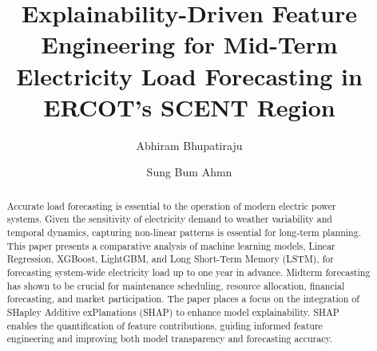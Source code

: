 \documentclass{ifacconf}
\begin{document}
\begin{frontmatter}

\title{Explainability-Driven Feature Engineering for Mid-Term Electricity Load Forecasting in ERCOT's SCENT Region}


\author{Abhiram Bhupatiraju}
\address{Institute for Computing in Research}

\author{Sung Bum Ahmn}
\address{Electric Reliability Council of Texas, Taylor TX}

\begin{abstract}
Accurate load forecasting is essential to the operation of modern electric power systems. Given the sensitivity of electricity demand to weather variability and temporal dynamics, capturing non-linear patterns is essential for long-term planning. This paper presents a comparative analysis of machine learning models, Linear Regression, XGBoost, LightGBM, and Long Short-Term Memory (LSTM), for forecasting system-wide electricity load up to one year in advance. Midterm forecasting has shown to be crucial for maintenance scheduling, resource allocation, financial forecasting, and market participation. The paper places a focus on the integration of SHapley Additive exPlanations (SHAP) to enhance model explainability. SHAP enables the quantification of feature contributions, guiding informed feature engineering and improving both model transparency and forecasting accuracy.
\end{abstract}
\end{frontmatter}
\end{document}
